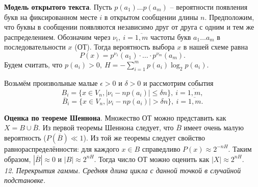 

\textbf{Модель открытого текста}. Пусть $p(a_1) \ldots p(a_m)$ -- вероятности появления букв на фиксированном месте $i$ в открытом сообщении длины $n$. Предположим, что буквы в сообщении появляются независимо друг от друга с одним и тем же распределением. Обозначим через $\nu_i,\ i = \overline{1, m}$ частоты букв $a_1 \ldots a_m$ в последовательности $x$ (ОТ). Тогда вероятность выбора $x$ в нашей схеме равна
$$P(x) = p^{\nu_1}(a_1) \cdot \ldots \cdot p^{\nu_m}(a_m).$$
Будем считать, что $p(a_i) > 0,\ H = - \sum_{i=1}^m p(a_i) \log_2{p(a_i)}$.

Возьмём произвольные малые $\epsilon > 0 $ и $\delta > 0$ и рассмотрим события
$$B_i = \{ x \in V_n, |\nu_i - np(a_i)| \le \delta n \},\ i = \overline{1, m},$$
$$\overline{B}_i = \{ x \in V_n, |\nu_i - np(a_i)| > \delta n \},\ i = \overline{1, m}.$$

\textbf{Оценка по теореме Шеннона}.
Множество ОТ можно представить как $X = B \cup \overline B$. Из первой теоремы Шеннона следует, что $\overline B$ имеет очень малую вероятность ($P(\overline B) \ll 1$). Из той же теоремы следует свойство равнораспределённости: для каждого $x \in B$ справедливо $P(x) \approx 2^{-nH}$. Таким образом, $|\overline B| \approx 0$ и $|B| \approx 2^{nH}$. Тогда число ОТ можно оценить как $|X| \approx 2^{nH}$. \\

\noindent \textit{12. Перекрытия гаммы. Средняя длина цикла с данной точкой в случайной подстановке.} \\

